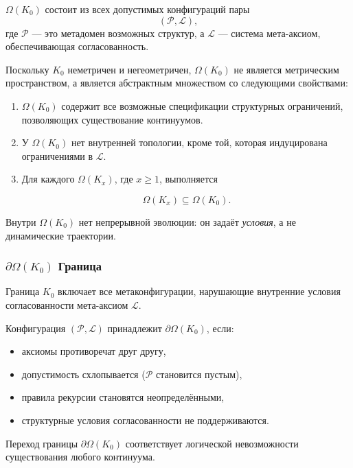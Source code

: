 $\Omega(K_0)$ состоит из всех допустимых конфигураций пары
\[
(\mathcal{P}, \mathcal{L}),
\]
где $\mathcal{P}$ — это метадомен возможных структур, а
$\mathcal{L}$ — система мета-аксиом, обеспечивающая согласованность.

Поскольку $K_0$ неметричен и негеометричен, $\Omega(K_0)$ не является
метрическим пространством, а является абстрактным множеством со следующими
свойствами:
\begin{enumerate}
    \item $\Omega(K_0)$ содержит все возможные спецификации структурных
          ограничений, позволяющих существование континуумов.
    \item У $\Omega(K_0)$ нет внутренней топологии, кроме той,
          которая индуцирована ограничениями в $\mathcal{L}$.
    \item Для каждого $\Omega(K_x)$, где $x \ge 1$, выполняется

          \[
              \Omega(K_x) \subseteq \Omega(K_0).
          \]
\end{enumerate}

Внутри $\Omega(K_0)$ нет непрерывной эволюции: он задаёт
\emph{условия}, а не динамические траектории.

\subsubsection{\texorpdfstring{$\partial\Omega(K_0)$}{\partial\Omega(K_0)} Граница}

Граница $K_0$ включает все метаконфигурации, нарушающие
внутренние условия согласованности мета-аксиом $\mathcal{L}$.

Конфигурация $(\mathcal{P},\mathcal{L})$ принадлежит
$\partial\Omega(K_0)$, если:
\begin{itemize}
    \item аксиомы противоречат друг другу,
    \item допустимость схлопывается ($\mathcal{P}$ становится пустым),
    \item правила рекурсии становятся неопределёнными,
    \item структурные условия согласованности не поддерживаются.
\end{itemize}

Переход границы $\partial\Omega(K_0)$ соответствует логической
невозможности существования
любого континуума.

